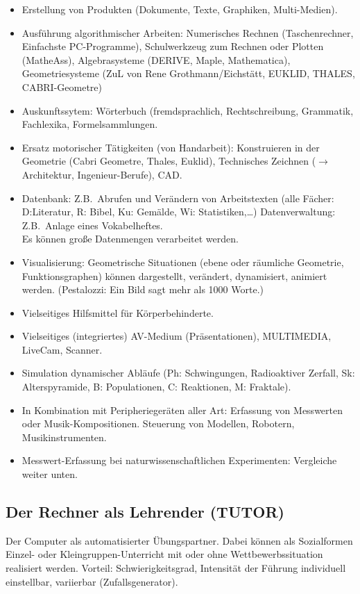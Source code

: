 \begin{itemize}
\item
Erstellung von Produkten (Dokumente, Texte, Graphiken, Multi-Medien).
\item
Ausf\"{u}hrung algorithmischer Arbeiten: Numerisches Rechnen
(Taschenrechner, Einfachste PC-Programme), Schulwerkzeug zum
Rechnen oder Plotten  (Mathe\-Ass), Algebrasysteme (DERIVE,
Maple, Mathematica), Geometriesysteme (ZuL von Rene Grothmann/Eichst\"{a}tt, EUKLID, THALES, CA\-BRI-\-Geo\-metre)
\item
Auskunftssytem: W\"{o}rterbuch (fremdsprachlich, Rechtschreibung,
Grammatik, Fachlexika, Formelsammlungen.
\item
Ersatz motorischer T\"{a}tigkeiten (von Handarbeit): Konstruieren in
der Geometrie (Cabri Geometre, Thales, Euklid), Technisches
Zeichnen ($\to$ Architektur, In\-ge\-nieur-Berufe), CAD.
\item
Datenbank: Z.B.\ Abrufen und Ver\"{a}ndern von Arbeitstexten (alle
F\"{a}cher: D:Li\-te\-ra\-tur, R: Bibel, Ku: Gem\"{a}lde, Wi:
Statistiken,\dots)
Datenverwaltung: Z.B.\ Anlage eines Vokabelheftes. \\
Es k\"{o}nnen gro{\ss}e Datenmengen verarbeitet werden.
\item
Visualisierung: Geometrische Situationen (ebene oder r\"{a}umliche
Geometrie, Funktionsgraphen) k\"{o}nnen dargestellt, ver\"{a}ndert,
dynamisiert, animiert werden. (Pestalozzi: Ein Bild sagt mehr als 1000 Worte.)
\item
Vielseitiges Hilfsmittel f\"{u}r K\"{o}rperbehinderte.
\item
Vielseitiges (integriertes) AV-Medium (Pr\"{a}sentationen),
MULTIMEDIA, LiveCam, Scanner.
\item
Simulation dynamischer Abl\"{a}ufe (Ph: Schwingungen, Radioaktiver Zerfall,
Sk: Alterspyramide, B: Populationen, C: Reaktionen, M: Fraktale).
\item
In Kombination mit Peripherieger\"{a}ten aller Art: Erfassung von
Messwerten oder Musik-Kompositionen. Steuerung von Modellen,
Robotern, Musikinstrumenten.

\item
Messwert-Erfassung bei naturwissenschaftlichen Experimenten: Vergleiche weiter unten.
\end{itemize}

\subsection{Der Rechner als Lehrender (TUTOR)}
Der Computer als automatisierter \"{U}bungspartner. Dabei k\"{o}nnen als Sozialformen
Einzel- oder Kleingruppen-Unterricht mit oder ohne
Wettbewerbssituation realisiert werden. Vorteil:
Schwierigkeitsgrad, Intensit\"{a}t der F\"{u}hrung individuell
einstellbar, variierbar (Zufallsgenerator).

